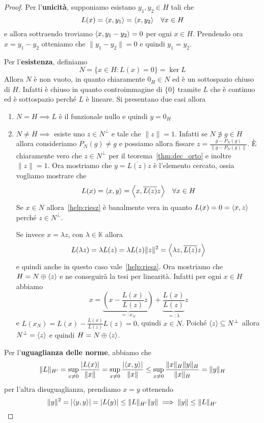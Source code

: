 \begin{proof}
    Per l'\textbf{unicità}, supponiamo esistano \(y_{1}, y_{2} \in H\) tali che
    \[
        L{(x)} = {\left\langle x, y_{1}\right\rangle} = {\left\langle x, y_{2}\right\rangle} \quad \forall x \in H
    \]
    e allora sottraendo troviamo \({\left\langle x, y_{1} - y_{2}\right\rangle} = 0\) per ogni \(x
    \in H\). Prendendo ora \(x = y_{1} - y_{2}\) otteniamo che \(\|y_{1} -
    y_{2}\| = 0\) e quindi \(y_{1} = y_{2}\).

    Per l'\textbf{esistenza}, definiamo 
    \[
      N = \{x \in H : L{(x)} = 0\} = \ker L
    \]
    Allora \(N\) è non vuoto, in quanto chiaramente \(0_H \in N\) ed è un
    sottospazio chiuso di \(H\). Infatti è chiuso in quanto controimmagine di
    \(\{0\} \) tramite \(L\) che è continuo ed è sottospazio perché \(L\) è
    lineare. Si presentano due casi allora
\begin{enumerate}[label = \arabic*.]
    \item \(N = H \implies L\) è il funzionale nullo e quindi \(y = 0_H\) 
    \item \(N \neq H \implies \) esiste uno \(z \in N^\perp \) e tale che
        \(\|z\| = 1\). Infatti se \(N \not\ni g \in H \) allora consideriamo
        \(P_N{(g)} \neq g\) e possiamo allora fissare \(z = \frac{g -
        P_N{(g)}}{\|g - P_N{(g)}\|}\). È chiaramente vero che \(z \in N^\perp \)
        per il teorema~\ref{thm:dec_orto} e inoltre \(\|z\| = 1\). Ora mostriamo
        che \(y = \overline{L{(z)}} z\) è l'elemento cercato, ossia vogliamo
        mostrare che
        \begin{equation}\label{help:riesz}
        L{(x)} = {\left\langle x, y\right\rangle} = {\left\langle x, \overline{L{(z)}}z\right\rangle}  \quad \forall x \in H
        \end{equation}
        Se \(x \in N\) allora~\eqref{help:riesz} è banalmente vera in quanto
        \(L{(x)} = 0 = {\left\langle x, z\right\rangle}\) perché \(z \in N^\perp\).

        Se invece \(x = \lambda z\), con \(\lambda \in \mathbb{K}\) allora
        \[
          L{(\lambda z)} = \lambda L{(z)} = \lambda L{(z)} \|z\|^2 =
          {\left\langle\lambda z, \overline{L{(z)}}z\right\rangle} 
        \]
        e quindi anche in questo caso vale~\eqref{help:riesz}. Ora mostriamo che
        \(H = N \oplus {\left\langle z\right\rangle} \) e ne conseguirà la tesi per linearità.
        Infatti per ogni \(x \in H\) abbiamo
        \[
          x = \underbrace{\left( x - \frac{L{(x)}}{L{(z)}}z \right)}_{ =: x_N}  +
          \underbrace{\frac{L{(x)}}{L{(z)}}}_{=: \lambda}  z
        \]
        e \(L{(x_N)} = L{(x)} - \frac{L{(x)}}{L{(z)}} L{(z)} = 0\), quindi \(x
        \in N\). Poiché \({\left\langle z\right\rangle} \subseteq N^\perp  \) allora \(N^\perp  =
        {\left\langle z\right\rangle} \) e quindi \(H = N \oplus {\left\langle z\right\rangle} \). 
\end{enumerate}
    Per l'\textbf{uguaglianza delle norme}, abbiamo che 
    \[
        \|L\|_{H'}  = \sup_{x \neq 0} \frac{\left| L{(x)} \right| }{\|x\|} =
    \sup_{x \neq 0} \frac{\left| {\left\langle x, y\right\rangle}  \right|} {\|x\|} \le \sup_{x \neq
    0} \frac{\|x\|_H \|y\|_H}{\|x\|_H} = \|y\|_H
    \]
    per l'altra disuguaglianza, prendiamo \(x = y\) ottenendo
    \[
        \|y\|^2 = \left| {\left\langle y, y\right\rangle}  \right| = \left| L{(y)} \right| \le
        \|L\|_{H'} \|y\| \implies \|y\| \le \|L\|_{H'}
    \]
\end{proof}

